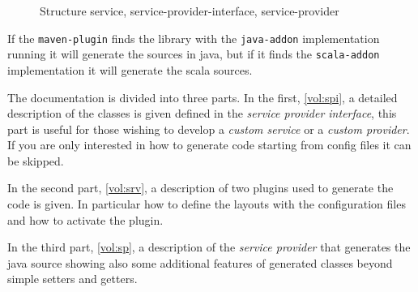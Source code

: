\documentclass[a4paper,10pt]{report}
\begin{document}
\begin{figure}[!htb]
\centering
{}
\caption{Structure service, service-provider-interface, service-provider} 
\label{fig:spi}
\end{figure}

If the \verb!maven-plugin! finds the library with the \verb!java-addon! 
implementation running it will generate the sources in java, but if it finds 
the \verb!scala-addon! implementation it will generate the scala sources.

The documentation is divided into three parts. In the first, \ref{vol:spi}, a 
detailed description of the classes is given defined in the 
\textsl{service provider interface}, this part is useful for those wishing to 
develop a \textit{custom service} or a \textit{custom provider}. 
If you are only interested in how to generate code starting from config files 
it can be skipped.

In the second part, \ref{vol:srv}, a description of two plugins used to generate 
the code is given. In particular how to define the layouts with the 
configuration files and how to activate the plugin.

In the third part, \ref{vol:sp}, a description of the \textsl{service provider} 
that generates the java source showing also some additional features of 
generated classes beyond simple setters and getters.
\end{document}
